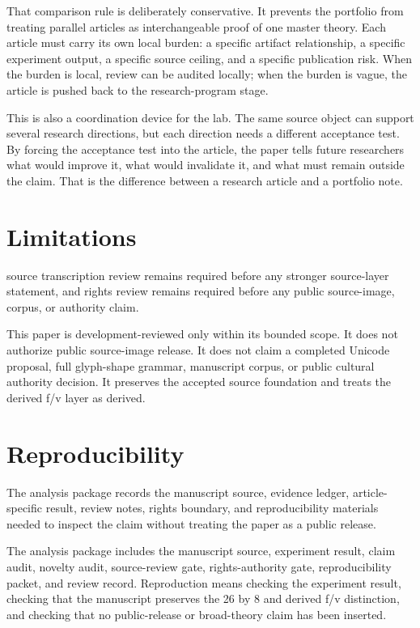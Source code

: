 \documentclass[sigconf,nonacm]{acmart}
\begin{document}
That comparison rule is deliberately conservative. It prevents the portfolio
from treating parallel articles as interchangeable proof of one master theory.
Each article must carry its own local burden: a specific artifact relationship,
a specific experiment output, a specific source ceiling, and a specific
publication risk. When the burden is local, review can be audited locally; when
the burden is vague, the article is pushed back to the research-program stage.

This is also a coordination device for the lab. The same source object can
support several research directions, but each direction needs a different
acceptance test. By forcing the acceptance test into the article, the paper tells
future researchers what would improve it, what would invalidate it, and what
must remain outside the claim. That is the difference between a research article
and a portfolio note.

\section{Limitations}
source transcription review remains required before any stronger source-layer statement, and rights review remains required before any public source-image, corpus, or authority claim. 

This paper is development-reviewed only within its bounded scope. It does not
authorize public source-image release. It does not claim a completed Unicode
proposal, full glyph-shape grammar, manuscript corpus, or public cultural
authority decision. It preserves the accepted source foundation and treats the
derived f/v layer as derived.

\section{Reproducibility}
The analysis package records the manuscript source, evidence ledger, article-specific result, review notes, rights boundary, and reproducibility materials needed to inspect the claim without treating the paper as a public release. 

The analysis package includes the manuscript source, experiment result, claim
audit, novelty audit, source-review gate, rights-authority gate,
reproducibility packet, and review record. Reproduction means checking the
experiment result, checking that the manuscript preserves the 26 by 8 and
derived f/v distinction, and checking that no public-release or broad-theory
claim has been inserted.
\end{document}
